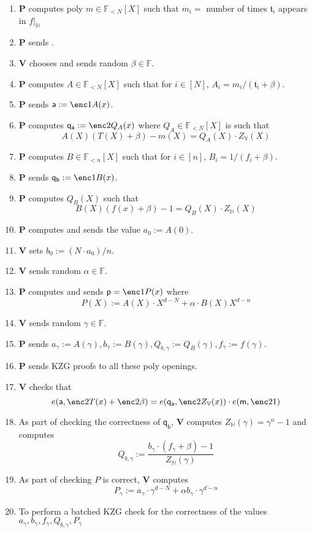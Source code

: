 \documentclass[11pt]{article} %
\newcommand{\F}{\ensuremath{\mathbb F}\xspace}
\newcommand{\defeq}{:=}
\newcommand{\prv}{\ensuremath{\mathsf{\mathbf{P}}}\xspace}
\newcommand{\ver}{\ensuremath{\mathsf{\mathbf{V}}}\xspace}
\newcommand{\polysofdeg}[1]{\ensuremath{\F_{< #1}[X]}\xspace}
\newcommand{\restricttoset}[2]{\ensuremath{#1|_{#2}}\xspace}
\newcommand{\subspace}{\ensuremath{\mathbb{H}}\xspace}
\newcommand{\bigspace}{\ensuremath{\mathbb{V}}\xspace}
\newcommand{\witsize}{\ensuremath{n}\xspace}
\newcommand{\tabsize}{\ensuremath{N}\xspace}
\newcommand{\tab}{\ensuremath{\mathfrak{t}}\xspace}
\renewcommand{\a}{\ensuremath{\mathsf{a}}\xspace}
\renewcommand{\p}{\ensuremath{\mathsf{p}}\xspace}
\newcommand{\qa}{\ensuremath{\mathsf{q_a}}\xspace}
\newcommand{\qb}{\ensuremath{\mathsf{q_b}}\xspace}
\newcommand{\m}{\ensuremath{\mathsf{m}}\xspace}
\newcommand{\agam}{\ensuremath{a_\gamma}\xspace}
\newcommand{\bgam}{\ensuremath{b_\gamma}\xspace}
\newcommand{\qbgam}{\ensuremath{Q_{b,\gamma}}\xspace}
\newcommand{\fgam}{\ensuremath{f_{\gamma}}\xspace}
\newcommand{\pgam}{\ensuremath{P_{\gamma}}\xspace}
\begin{document}
\begin{enumerate}
 \item \prv computes poly $m\in \polysofdeg{\tabsize}$ such that $m_i=$ number of times $\tab_i$ appears in \restricttoset{f}{\subspace}
 \item \prv sends .
 \item \ver chooses and sends random $\beta \in \F$.
\item \prv computes $A\in \polysofdeg{\tabsize}$ such that for $i\in [\tabsize]$, $A_i = m_i/(\tab_i+\beta)$.
\item \prv sends $\a\defeq \enc1{A(x)}$.
\item\label{step:computeQA} \prv computes $\qa \defeq \enc2{Q_A(x)}$ where $Q_A\in \polysofdeg{\tabsize}$ is such that 
\[A(X)(T(X)+\beta)-m(X)= Q_A(X)\cdot Z_\bigspace(X)\]
\item \prv computes $B\in \polysofdeg{\witsize}$ such that for $i\in [\witsize]$, $B_i=1/(f_i+\beta)$.
\item \prv sends $\qb\defeq \enc1{B(x)}$.
\item \prv computes $Q_B(X)$ such that 
\[B(X)(f(x)+\beta)-1 = Q_B(X)\cdot Z_\subspace(X)\]
\item \prv computes and sends the value $a_0\defeq A(0)$.
\item \ver  sets $b_0\defeq (\tabsize\cdot a_0)/\witsize$.
\item \ver sends random $\alpha\in \F$.
\item \prv computes and sends $\p=\enc1{P(x)}$ where
\[P(X)\defeq A(X)\cdot X^{d-\tabsize} + \alpha\cdot B(X)X^{d-\witsize}\]
\item \ver sends random $\gamma \in \F$.
\item \prv sends $\agam \defeq A(\gamma),\bgam \defeq B(\gamma),\qbgam \defeq Q_B(\gamma),\fgam \defeq f(\gamma)$.
\item \prv sends KZG proofs to all these poly openings.
\item\label{step:checkqa} \ver checks that
\[e(\a,\enc2{T(x)}+\enc2{\beta})=e(\qa,\enc2{Z_\bigspace(x)})\cdot e(\m,\enc2{1})\]
\item As part of checking the correctness of \qb, \ver computes $ Z_\subspace(\gamma) = \gamma^\witsize -1$ and computes
\[\qbgam\defeq \frac{\bgam\cdot (\fgam + \beta)-1}{Z_\subspace(\gamma)}\]
\item As part of  checking $P$ is correct, \ver computes 
\[\pgam\defeq \agam\cdot \gamma^{d-\tabsize}+\alpha\bgam\cdot \gamma^{d-\witsize}\]
\item To perform a batched KZG check for the correctness of the values  $\agam,\bgam,\fgam,\qbgam,\pgam$

\end{enumerate}
\end{document}
